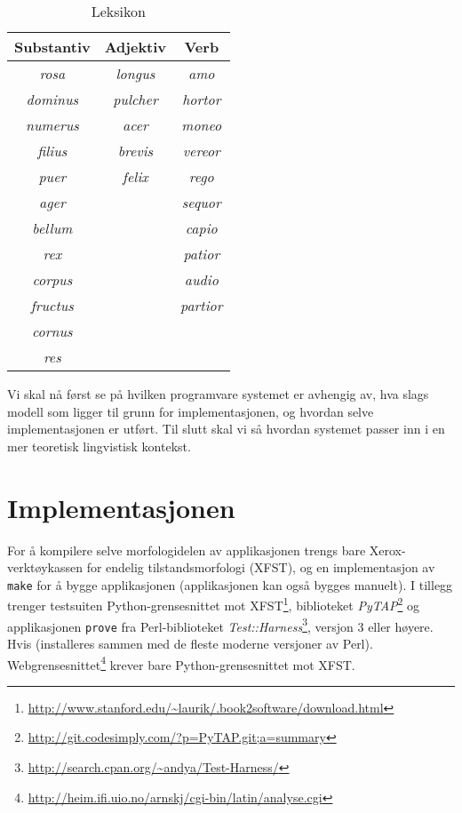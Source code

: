 \documentclass{article}
\newcommand\note[1]{\marginpar{\raggedright\tiny#1}}
\newcommand\link[1]{\href{#1}{#1}}
\let\lib\emph
\let\prog\texttt
\let\w\emph
\begin{document}
\begin{table}
\begin{center}
\begin{tabular}{|ccc|}
    \hline
Substantiv  & Adjektiv    & Verb \\
    \hline
\w{rosa}    & \w{longus}  & \w{amo}     \\
\w{dominus} & \w{pulcher} & \w{hortor}  \\
\w{numerus} & \w{acer}    & \w{moneo}   \\
\w{filius}  & \w{brevis}  & \w{vereor}  \\
\w{puer}    & \w{felix}   & \w{rego}    \\
\w{ager}    &             & \w{sequor}  \\
\w{bellum}  &             & \w{capio}   \\
\w{rex}     &             & \w{patior}  \\
\w{corpus}  &             & \w{audio}   \\
\w{fructus} &             & \w{partior} \\
\w{cornus}  &             &             \\
\w{res}     &             &             \\
    \hline
\end{tabular}
\end{center}
\caption{Leksikon}
\label{leksikon}
\end{table}

Vi skal n\aa{} f\o{}rst se p\aa{} hvilken programvare systemet er avhengig av,
hva slags modell som ligger til grunn for implementasjonen, og hvordan selve
implementasjonen er utf\o{}rt. Til slutt skal vi s\aa{} hvordan systemet
passer inn i en mer teoretisk lingvistisk kontekst.

\section{Implementasjonen}
For \aa{} kompilere selve morfologidelen av applikasjonen trengs bare
Xerox-verkt\o{}ykassen for endelig tilstandsmorfologi (XFST), og en
implementasjon av \prog{make} for \aa{} bygge applikasjonen (applikasjonen kan
ogs\aa{} bygges manuelt). I tillegg trenger testsuiten Python-grensesnittet mot
XFST\footnote{\href{http://www.stanford.edu/~laurik/.book2software/download.html}
{http://www.stanford.edu/\~{}laurik/.book2software/download.html}}, biblioteket
\lib{PyTAP}\footnote{\link{http://git.codesimply.com/?p=PyTAP.git;a=summary}}
og applikasjonen \prog{prove} fra Perl-biblioteket
\lib{Test::Harness}\footnote{\href{http://search.cpan.org/~andya/Test-Harness/}
{http://search.cpan.org/\~{}andya/Test-Harness/}},
versjon 3 eller h\o{}yere. Hvis 
(installeres sammen med de fleste moderne versjoner av Perl\note{Sjekke at
dette stemmer.}).
Webgrensesnittet\footnote{\link{http://heim.ifi.uio.no/arnskj/cgi-bin/latin/analyse.cgi}}
krever bare Python-grensesnittet mot XFST.
\end{document}
